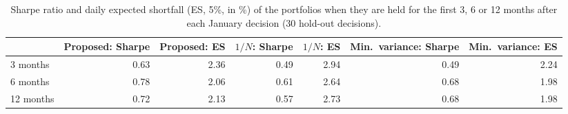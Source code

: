 \begin{table}[!htbp]
\centering
\footnotesize
\caption{Sharpe ratio and daily expected shortfall (ES, 5\%, in \%) of the portfolios when they are held for the first 3, 6 or 12 months after each January decision (30 hold-out decisions).}\label{tab:horizon}
\begin{adjustbox}{max width=\textwidth}
\begin{tabular}{lrrrrrr}
\toprule
 & Proposed: Sharpe & Proposed: ES & $1/N$: Sharpe & $1/N$: ES & Min.\ variance: Sharpe & Min.\ variance: ES \\
\midrule
3 months & 0.63 & 2.36 & 0.49 & 2.94 & 0.49 & 2.24 \\
6 months & 0.78 & 2.06 & 0.61 & 2.64 & 0.68 & 1.98 \\
12 months & 0.72 & 2.13 & 0.57 & 2.73 & 0.68 & 1.98 \\
\bottomrule
\end{tabular}
\end{adjustbox}
\end{table}
